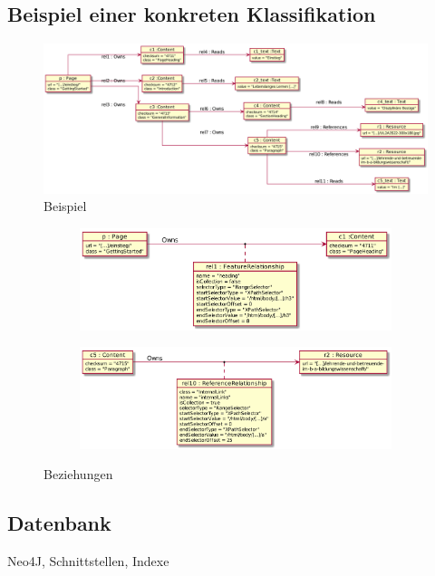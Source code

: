     \subsection{Beispiel einer konkreten Klassifikation}
        \begin{figure}
            \centering
            \includegraphics[width=\textwidth]{../resources/db-data-model/example/example.png}
            \caption{Beispiel}
            \label{image:dbDataModelExampleOverview}
        \end{figure}

        \begin{figure}
            \centering
            \begin{subfigure}{\textwidth}
                \includegraphics[width=\textwidth]{../resources/db-data-model/example/p-c1.png}
            \end{subfigure}

            \begin{subfigure}{\textwidth}
                \includegraphics[width=\textwidth]{../resources/db-data-model/example/c5-r2.png}
            \end{subfigure}
            \caption{Beziehungen}
            \label{image:dbDataModelExampleRelationships}
        \end{figure}

    \subsection{Datenbank}
        Neo4J, Schnittstellen, Indexe